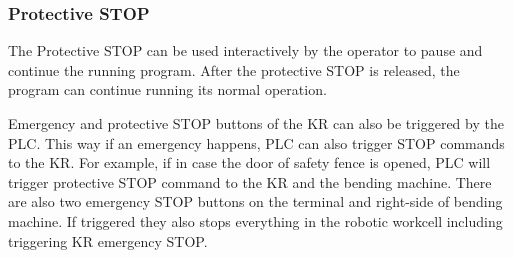    \subsubsection{Protective STOP}
    The Protective STOP can be used interactively by the operator to pause and continue the running program.
    After the protective STOP is released, the program can continue running its normal operation.

\vspace{1\baselineskip}
Emergency and protective STOP buttons of the KR can also be triggered by the PLC. This way
if an emergency happens, PLC can also trigger STOP commands to the KR. For example, if in
case the door of safety fence is opened, PLC will trigger protective STOP command to the 
KR and the bending machine.
There are also two emergency STOP buttons on the terminal and right-side of bending machine. If triggered
they also stops everything in the robotic workcell including triggering KR emergency STOP.
